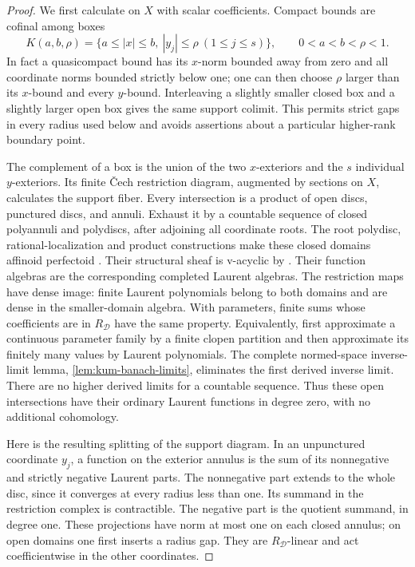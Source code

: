 \begin{proof}
We first calculate on $X$ with scalar coefficients.  Compact bounds
are cofinal among boxes
\[
 K(a,b,\rho)=
 \{a\leq|x|\leq b,\ |y_j|\leq\rho\ (1\leq j\leq s)\},
 \qquad 0<a<b<\rho<1.
\]
In fact a quasicompact bound has its $x$-norm bounded away from zero and
all coordinate norms bounded strictly below one; one can then choose
$\rho$ larger than its $x$-bound and every $y$-bound.  Interleaving a
slightly smaller closed box and a slightly larger open box gives the
same support colimit.  This permits strict gaps in every radius used
below and avoids assertions about a particular higher-rank boundary
point.

The complement of a box is the union of the two $x$-exteriors and the
$s$ individual $y$-exteriors.  Its finite \v Cech restriction diagram,
augmented by sections on $X$, calculates the support fiber.
Every intersection is a product of open discs, punctured discs, and
annuli.  Exhaust it by a countable sequence of closed polyannuli and
polydiscs, after adjoining all coordinate roots. The root polydisc,
rational-localization and product constructions make these closed domains
affinoid perfectoid
\citep[Proposition~5.20, Theorem~6.3\textup{(i)--(ii)}, and Proposition~6.18]{scholzePerfectoid2012}.
Their structural sheaf is v-acyclic by
\cite[Proposition~8.8]{scholzeDiamonds2017}.  Their function algebras
are the corresponding completed Laurent algebras.  The restriction
maps have dense image: finite Laurent polynomials belong to both
domains and are dense in the smaller-domain algebra.  With parameters,
finite sums whose coefficients are in $R_{\mathcal D}$ have the same
property.  Equivalently, first approximate a continuous parameter
family by a finite clopen partition and then approximate its finitely
many values by Laurent polynomials.  The complete normed-space
inverse-limit lemma, \cref{lem:kum-banach-limits}, eliminates the first
derived inverse limit.  There are no higher derived limits for a
countable sequence.  Thus these open intersections have their ordinary
Laurent functions in degree zero, with no additional cohomology.

Here is the resulting splitting of the support diagram.  In an
unpunctured coordinate $y_j$, a function on the exterior annulus is the
sum of its nonnegative and strictly negative Laurent parts.  The
nonnegative part extends to the whole disc, since it converges at every
radius less than one.  Its summand in the restriction complex is
contractible.  The negative part is the quotient summand, in degree
one.  These projections have norm at most one on each closed annulus;
on open domains one first inserts a radius gap.  They are
$R_{\mathcal D}$-linear and act coefficientwise in the other
coordinates.


\end{proof}
